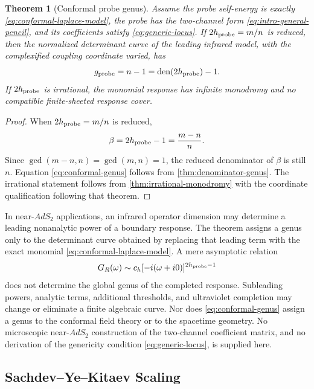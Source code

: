 \documentclass[11pt,reqno]{amsart}
\newtheorem{theorem}{Theorem}[section]
\theoremstyle{remark}
\newcommand{\den}{\operatorname{den}}
\begin{document}
\begin{theorem}[Conformal probe genus]\label{thm:conformal-probe}
Assume the probe self-energy is exactly \eqref{eq:conformal-laplace-model},
the probe has the two-channel form \eqref{eq:intro-general-pencil}, and its
coefficients satisfy \eqref{eq:generic-locus}.  If
$2h_{\rm probe}=m/n$ is reduced, then the normalized determinant curve of
the leading infrared model, with the complexified coupling coordinate varied,
has
\begin{equation}\label{eq:conformal-genus}
 g_{\rm probe}=n-1=\den(2h_{\rm probe})-1.
\end{equation}
If $2h_{\rm probe}$ is irrational, the monomial response has infinite
monodromy and no compatible finite-sheeted response cover.
\end{theorem}

\begin{proof}
When $2h_{\rm probe}=m/n$ is reduced,
\[
 \beta=2h_{\rm probe}-1=\frac{m-n}{n}.
\]
Since $\gcd(m-n,n)=\gcd(m,n)=1$, the reduced denominator of $\beta$ is still
$n$.  Equation \eqref{eq:conformal-genus} follows from
\cref{thm:denominator-genus}.  The irrational statement follows from
\cref{thm:irrational-monodromy} with the coordinate qualification following
that theorem.
\end{proof}

In near-$AdS_2$ applications, an infrared operator dimension may determine a
leading nonanalytic power of a boundary response.  The theorem assigns a
genus only to the determinant curve obtained by replacing that leading term
with the exact monomial \eqref{eq:conformal-laplace-model}.  A mere asymptotic
relation
\begin{equation}\label{eq:conformal-asymptotic-only}
 G_R(\omega)\sim c_h[-i(\omega+i0)]^{2h_{\rm probe}-1}
\end{equation}
does not determine the global genus of the completed response.  Subleading
powers, analytic terms, additional thresholds, and ultraviolet completion
may change or eliminate a finite algebraic curve.  Nor does
\eqref{eq:conformal-genus} assign a genus to the conformal field theory or to
the spacetime geometry.  No microscopic near-$AdS_2$ construction of the
two-channel coefficient matrix, and no derivation of the genericity condition
\eqref{eq:generic-locus}, is supplied here.

\subsection{Sachdev--Ye--Kitaev Scaling}
\end{document}
